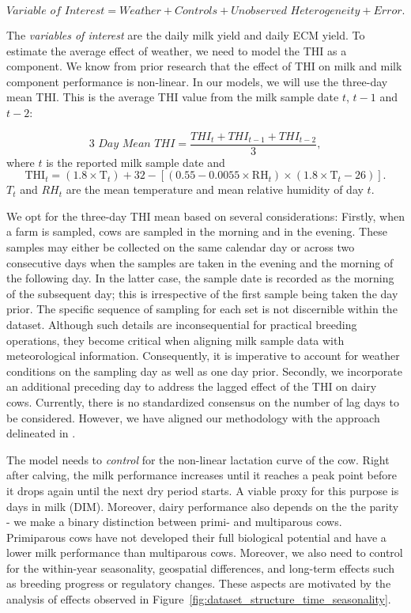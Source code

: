 \begin{equation}\label{eq:empirical_strategy}
    \textit{Variable of Interest} = \textit{Weather} + \textit{Controls} + \textit{Unobserved Heterogeneity} + \textit{Error}.
\end{equation}

The \textit{variables of interest} are the daily milk yield and daily ECM yield. To estimate the average effect of weather, we need to model the THI as a component. We know from prior research that the effect of THI on milk and milk component performance is non-linear. In our models, we will use the three-day mean THI. This is the average THI value from the milk sample date $t$, $t-1$ and $t-2$: 

\begin{equation}
    \textit{3 Day Mean THI} = \frac{THI_t + THI_{t-1} + THI_{t-2}}{3},
\end{equation}
where $t$ is the reported milk sample date and 
\begin{equation}
    \text{THI}_t = (1.8 \times \text{T}_t) + 32 - \left[ (0.55 - 0.0055 \times \text{RH}_t) \times (1.8 \times \text{T}_t - 26) \right].
\end{equation}
 $T_t$ and $RH_t$ are the mean temperature and mean relative humidity of day $t$.

We opt for the three-day THI mean based on several considerations: Firstly, when a farm is sampled, cows are sampled in the morning and in the evening. These samples may either be collected on the same calendar day or across two consecutive days when the samples are taken in the evening and the morning of the following day. In the latter case, the sample date is recorded as the morning of the subsequent day; this is irrespective of the first sample being taken the day prior. The specific sequence of sampling for each set is not discernible within the dataset. Although such details are inconsequential for practical breeding operations, they become critical when aligning milk sample data with meteorological information. Consequently, it is imperative to account for weather conditions on the sampling day as well as one day prior. Secondly, we incorporate an additional preceding day to address the lagged effect of the THI on dairy cows. Currently, there is no standardized consensus on the number of lag days to be considered. However, we have aligned our methodology with the approach delineated in \cite{bryant_quantifying_2007}.

The model needs to \textit{control} for the non-linear lactation curve of the cow. Right after calving,  the milk performance increases until it reaches a peak point before it drops again until the next dry period starts. A viable proxy for this purpose is days in milk (DIM). Moreover, dairy performance also depends on the the parity - we make a binary distinction between primi- and multiparous cows. Primiparous cows have not developed their full biological potential and have a lower milk performance than multiparous cows. Moreover, we also need to control for the within-year seasonality, geospatial differences, and long-term effects such as breeding progress or regulatory changes. These aspects are motivated by the analysis of effects observed in Figure~\ref{fig:dataset_structure_time_seasonality}.

